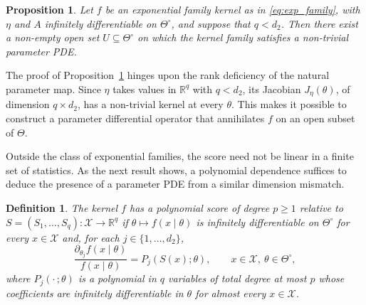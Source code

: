 \documentclass[11pt,twoside]{article} %
\newtheorem{proposition}{Proposition}
\newtheorem{definition}{Definition}
\begin{document}
\begin{proposition}\label{prop:exp_family_pde}
Let $f$ be an exponential family kernel as in \eqref{eq:exp_family}, with $\eta$ and $A$ infinitely differentiable on $\Theta^\circ$, and suppose that $q<d_2$. Then there exist a non-empty open set $U\subseteq\Theta^\circ$ on which the kernel family satisfies a non-trivial parameter PDE.
\end{proposition}

The proof of Proposition~\ref{prop:exp_family_pde} hinges upon the rank deficiency of the natural parameter map. Since $\eta$ takes values in $\mathbb R^{q}$ with $q<d_2$, its Jacobian $J_\eta(\theta)$, of dimension $q\times d_2$, has a non-trivial kernel at every $\theta$.  This makes it possible to construct a parameter differential operator that annihilates $f$ on an open subset of $\Theta$. %
%

Outside the class of exponential families, the score need not be linear in a finite set of statistics. As the next result shows, a polynomial dependence suffices to deduce the presence of a parameter PDE from a similar dimension mismatch.

\begin{definition}\label{def:polynomial_score}
The kernel $f$ has a \emph{polynomial score} of degree $p\ge1$ relative to $S=(S_1,\ldots,S_q):\mathcal X\to\mathbb R^q$ if $\theta\mapsto f(x\mid\theta)$ is infinitely differentiable on $\Theta^\circ$ for every $x\in\mathcal X$ and, for each $j\in\{1,\ldots,d_2\}$,
%
\begin{equation*}
    \frac{\partial_{\theta_j}f(x\mid\theta)}{f(x\mid\theta)}=P_j(S(x);\theta),\qquad x\in\mathcal X,\ \theta\in\Theta^\circ,
\end{equation*}
%
where $P_j(\cdot\,;\theta)$ is a polynomial in $q$ variables of total degree at most $p$ whose coefficients are infinitely differentiable in $\theta$ for almost every $x \in \mathcal{X}$. 
\end{definition}
\end{document}
